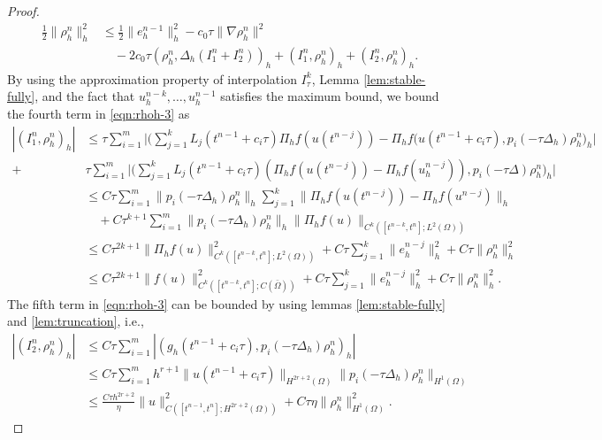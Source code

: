 \documentclass[a4paper, oneside]{book}
\def\II{(\Omega)}
\begin{document}
\begin{proof}
\begin{equation}
\begin{aligned}
 \frac12 \| \rho_h^n \|_h^2 %
&\le \frac12\|  e_h^{n-1} \|_h^2 - c_0\tau \| \nabla \rho_h^n\|^2\\
&\quad- 2c_0\tau ( \rho_h^n,\Delta_h (I_1^n+I_2^n))_h + (I_1^n,\rho_h^n)_h + (I_2^n,\rho_h^n)_h.
\end{aligned}
\end{equation}
By using the approximation property of interpolation $I_\tau^k$, Lemma \ref{lem:stable-fully},
 and the fact that $u_h^{n-k},\dots,u_h^{n-1}$ satisfies the maximum bound,
we bound the fourth term in \eqref{eqn:rhoh-3}  as
\begin{align*}
 | (I_1^n,\rho_h^n)_h |  &\le   \tau \sum_{i=1}^m \Big|\Big( \sum_{j=1}^k L_j(t^{n-1} + c_i\tau) \Pi_hf(u(t^{n-j}))- \Pi_h f(u(t^{n-1} + c_i\tau), p_i(-\tau \Delta_h)\rho_h^n\Big)_h\Big|   \\
 +&  \tau \sum_{i=1}^m \Big| \Big( \sum_{j=1}^k L_j(t^{n-1} + c_i\tau) (\Pi_h f(u(t^{n-j}))-\Pi_hf(u_h^{n-j})), p_i(-\tau \Delta)\rho_h^n\Big)_h \Big| \\
   &\le  C \tau \sum_{i=1}^m \|p_i(-\tau \Delta_h)\rho_h^n \|_h  \sum_{j=1}^k  \|\Pi_hf(u(t^{n-j}))- \Pi_h f(u^{n-j})\|_h   \\
     &\quad+  C \tau^{k+1} \sum_{i=1}^m  \|p_i(-\tau \Delta_h)\rho_h^n \|_h  \|  \Pi_h f(u)  \|_{C^{k}([t^{n-k},t^n]; L^2\II)} \\
 &\le C\tau^{2k+1} \|  \Pi_h f(u)  \|_{C^{k}([t^{n-k},t^n]; L^2\II)}^2 + C \tau \sum_{j=1}^k \|  e_h^{n-j}  \|_h^2 +  C\tau \|  \rho_h^n \|_h^2 \\
  &\le C\tau^{2k+1} \|  f(u)  \|_{C^{k}([t^{n-k},t^n]; C(\bar\Omega))}^2 + C \tau \sum_{j=1}^k \|  e_h^{n-j}  \|_h^2 +  C\tau \|  \rho_h^n \|_h^2.
\end{align*}
The fifth term in \eqref{eqn:rhoh-3} can be bounded by using lemmas \ref{lem:stable-fully} and \ref{lem:truncation}, i.e.,
\begin{equation}\label{eqn:fully-I2}
\begin{split}
| (I_2^n,\rho_h^n)_h | &\le C \tau \sum_{i=1}^m |(g_h(t^{n-1}+c_i\tau), p_i(-\tau\Delta_h)\rho_h^n)_h| \\
&\le C\tau \sum_{i=1}^m h^{r+1} \| u(t^{n-1}+c_i\tau)  \|_{H^{2r+2}(\Omega)} \| p_i(-\tau\Delta_h) \rho_h^n \|_{H^1\II} \\
&\le \frac{C \tau h^{2r+2}}{\eta}  \| u  \|_{C([t^{n-1},t^n];H^{2r+2}(\Omega))}^2 + C\tau \eta  \| \rho_h^n \|_{H^1\II}^2.

\end{split}
\end{equation}
\end{proof}
\end{document}
